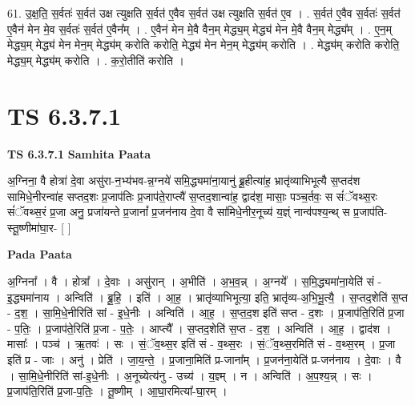 \documentclass[17pt]{extarticle}
\begin{document}
61. उ॒क्ष॒ति॒ स॒र्वतः॑ स॒र्वत॑ उक्ष त्युक्षति स॒र्वत॑ ए॒वैव स॒र्वत॑ उक्ष त्युक्षति स॒र्वत॑ ए॒व । . स॒र्वत॑ ए॒वैव स॒र्वतः॑ स॒र्वत॑ ए॒वैन॑ मेन मे॒व स॒र्वतः॑ स॒र्वत॑ ए॒वैन᳚म् । . ए॒वैन॑ मेन मे॒वै वैन॒म् मेद्ध्य॒म् मेद्ध्य॑ मेन मे॒वै वैन॒म् मेद्ध्य᳚म् । . ए॒न॒म् मेद्ध्य॒म् मेद्ध्य॑ मेन मेन॒म् मेद्ध्य॑म् करोति करोति॒ मेद्ध्य॑ मेन मेन॒म् मेद्ध्य॑म् करोति । . मेद्ध्य॑म् करोति करोति॒ मेद्ध्य॒म् मेद्ध्य॑म् करोति । . क॒रो॒तीति॑ करोति । \newline
\pagebreak
{}

\section{ TS 6.3.7.1 }

\textbf{TS 6.3.7.1 } \newline
\textbf{Samhita Paata} \newline

अ॒ग्निना॒ वै होत्रा॑ दे॒वा असु॑रा-न॒भ्य॑भव-न्न॒ग्नये॑ समि॒द्ध्यमा॑ना॒यानु॑ ब्रू॒हीत्या॑ह॒ भ्रातृ॑व्याभिभूत्यै स॒प्तद॑श सामिधे॒नीरन्वा॑ह सप्तद॒शः प्र॒जाप॑तिः प्र॒जाप॑ते॒राप्त्यै॑ स॒प्तद॒शान्वा॑ह॒ द्वाद॑श॒ मासाः॒ पञ्च॒र्तवः॒ स सं॑ॅवथ्स॒रः सं॑ॅवथ्स॒रं प्र॒जा अनु॒ प्रजा॑यन्ते प्र॒जानां᳚ प्र॒जन॑नाय दे॒वा वै सा॑मिधे॒नीर॒नूच्य॑ य॒ज्ञ्ं नान्व॑पश्य॒न्थ् स प्र॒जाप॑ति-स्तू॒ष्णीमा॑घा॒र- [  ] \newline

\textbf{Pada Paata} \newline

अ॒ग्निना᳚ । वै । होत्रा᳚ । दे॒वाः । असु॑रान् । अ॒भीति॑ । अ॒भ॒व॒न्न् । अ॒ग्नये᳚ । स॒मि॒द्ध्यमा॑ना॒येति॑ सं - इ॒द्ध्यमा॑नाय । अन्विति॑ । ब्रू॒हि॒ । इति॑ । आ॒ह॒ । भ्रातृ॑व्याभिभूत्या॒ इति॒ भ्रातृ॑व्य-अ॒भि॒भू॒त्यै॒ । स॒प्तद॒शेति॑ स॒प्त - द॒श॒ । सा॒मि॒धे॒नीरिति॑ सां - इ॒धे॒नीः । अन्विति॑ । आ॒ह॒ । स॒प्त॒द॒श इति॑ सप्त - द॒शः । प्र॒जाप॑ति॒रिति॑ प्र॒जा - प॒तिः॒ । प्र॒जाप॑ते॒रिति॑ प्र॒जा - प॒तेः॒ । आप्त्यै᳚ । स॒प्तद॒शेति॑ स॒प्त - द॒श॒ । अन्विति॑ । आ॒ह॒ । द्वाद॑श । मासाः᳚ । पञ्च॑ । ऋ॒तवः॑ । सः । सं॒ॅव॒थ्स॒र इति॑ सं - व॒थ्स॒रः । सं॒ॅव॒थ्स॒रमिति॑ सं - व॒थ्स॒रम् । प्र॒जा इति॑ प्र - जाः । अनु॑ । प्रेति॑ । जा॒य॒न्ते॒ । प्र॒जाना॒मिति॑ प्र-जाना᳚म् । प्र॒जन॑ना॒येति॑ प्र-जन॑नाय । दे॒वाः । वै । सा॒मि॒धे॒नीरिति॑ सां-इ॒धे॒नीः । अ॒नूच्येत्य॑नु - उच्य॑ । य॒ज्ञ्म् । न । अन्विति॑ । अ॒प॒श्य॒न्न् । सः । प्र॒जाप॑ति॒रिति॑ प्र॒जा-प॒तिः॒ । तू॒ष्णीम् । आ॒घा॒रमित्या᳚-घा॒रम् ।  \newline
\end{document}
